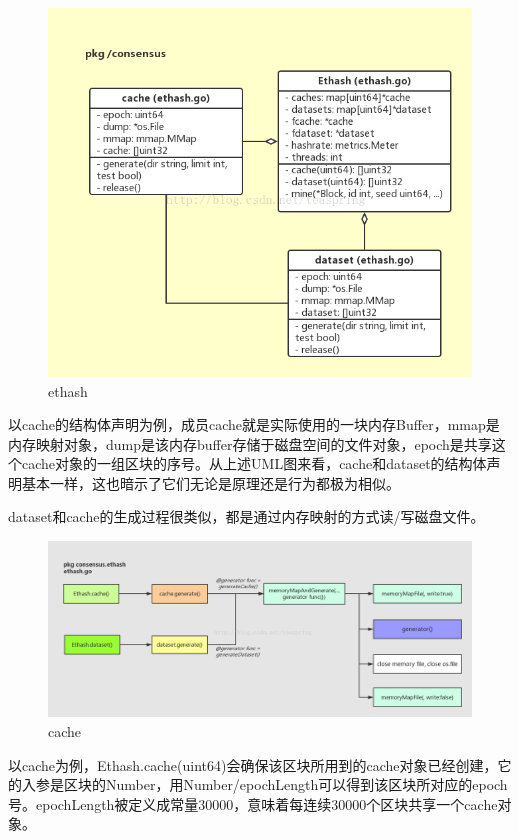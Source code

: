 \documentclass[UTF8]{ctexart}
\begin{document}
\begin{figure}
	\centering
	\includegraphics[scale=0.5]{ethash.png}
	\caption{ethash}
	\label{ethash}
\end{figure}


以cache{}的结构体声明为例，成员cache就是实际使用的一块内存Buffer，mmap是内存映射对象，dump是该内存buffer存储于磁盘空间的文件对象，epoch是共享这个cache{}对象的一组区块的序号。从上述UML图来看，cache和dataset的结构体声明基本一样，这也暗示了它们无论是原理还是行为都极为相似。



dataset{}和cache{}的生成过程很类似，都是通过内存映射的方式读/写磁盘文件。

\begin{figure}
	\centering
	\includegraphics[scale=0.3]{cache.png}
	\caption{cache}
	\label{cache}
\end{figure}

以cache{}为例，Ethash.cache(uint64)会确保该区块所用到的cache{}对象已经创建，它的入参是区块的Number，用Number/epochLength可以得到该区块所对应的epoch号。epochLength被定义成常量30000，意味着每连续30000个区块共享一个cache{}对象。
\end{document}
